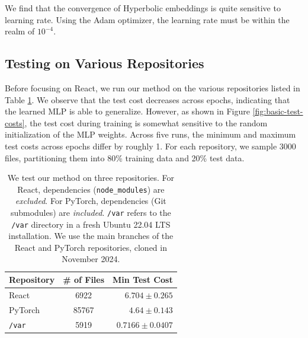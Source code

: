 \documentclass{article}
\begin{document}
We find that the convergence of Hyperbolic embeddings is quite sensitive to learning rate. Using the Adam optimizer, the learning rate must be within the realm of $10^{-4}$.

\subsection{Testing on Various Repositories}

Before focusing on React, we run our method on the various repositories listed in Table \ref{tab:repositories}. We observe that the test cost decreases across epochs, indicating that the learned MLP is able to generalize. However, as shown in Figure \ref{fig:basic-test-costs}, the test cost during training is somewhat sensitive to the random initialization of the MLP weights. Across five runs, the minimum and maximum test costs across epochs differ by roughly 1. For each repository, we sample 3000 files, partitioning them into 80\% training data and 20\% test data.

\begin{table}[H]
  \centering
  \begin{tabular}{lcr}
    \toprule
    \textbf{Repository} & \textbf{\# of Files} & \textbf{Min Test Cost} \\
    \midrule
    React               & 6922                 & $6.704 \pm 0.265$      \\
    PyTorch             & 85767                & $4.64 \pm 0.143$       \\
    \texttt{/var}       & 5919                 & $0.7166 \pm 0.0407$    \\
    \bottomrule
  \end{tabular}
  \caption{We test our method on three repositories. For React, dependencies (\texttt{node\_modules}) are \emph{excluded}. For PyTorch, dependencies (Git submodules) are \emph{included}. \texttt{/var} refers to the \texttt{/var} directory in a fresh Ubuntu 22.04 LTS installation. We use the main branches of the React and PyTorch repositories, cloned in November 2024.}
  \label{tab:repositories}
\end{table}
\end{document}
